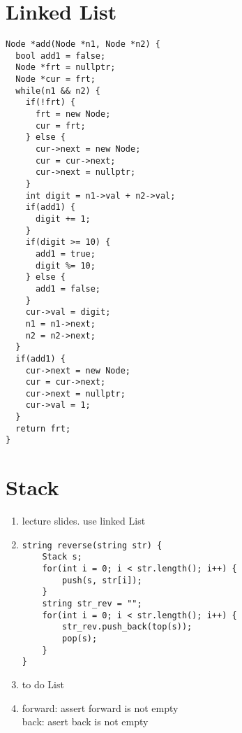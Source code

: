 \documentclass[12pt]{article}
\begin{document}
\section{Linked List}
\begin{verbatim}
Node *add(Node *n1, Node *n2) {
  bool add1 = false;
  Node *frt = nullptr;
  Node *cur = frt;
  while(n1 && n2) {
    if(!frt) {
      frt = new Node;
      cur = frt;
    } else {
      cur->next = new Node;
      cur = cur->next;
      cur->next = nullptr;
    }
    int digit = n1->val + n2->val;
    if(add1) {
      digit += 1;
    }
    if(digit >= 10) {
      add1 = true;
      digit %= 10;
    } else {
      add1 = false;
    }
    cur->val = digit;
    n1 = n1->next;
    n2 = n2->next;
  }
  if(add1) {
    cur->next = new Node;
    cur = cur->next;
    cur->next = nullptr;
    cur->val = 1;
  }
  return frt;
}
\end{verbatim}

\section{Stack}
\begin{enumerate}
    \item lecture slides. use linked List
    \item \begin{verbatim}
string reverse(string str) {
    Stack s;
    for(int i = 0; i < str.length(); i++) {
        push(s, str[i]);
    }
    string str_rev = "";
    for(int i = 0; i < str.length(); i++) {
        str_rev.push_back(top(s));
        pop(s);
    }
}
    \end{verbatim}
    \item to do List
    \item forward: assert forward is not empty\\
    back: asert back is not empty
\end{enumerate}
\end{document}
